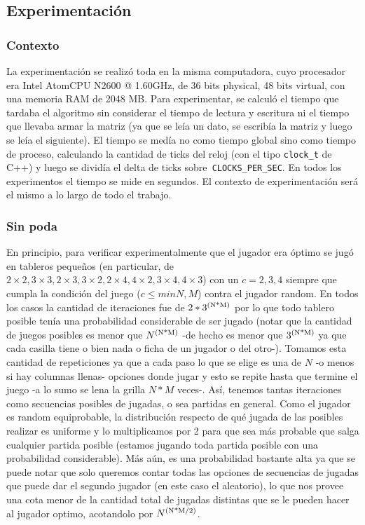 \documentclass[A4paper,oneside,fleqn,11pt]{article}
\theoremstyle{definition}
\begin{document}
\subsection{Experimentación}

\subsubsection{Contexto} 


La experimentación se realizó toda en la misma computadora, cuyo procesador era Intel Atom\texttrademark CPU N2600 @ 1.60GHz, de 36 bits physical, 48 bits virtual, con una memoria RAM de 2048 MB.  Para experimentar, se calculó el tiempo que tardaba el algoritmo sin considerar el tiempo de lectura y escritura ni el tiempo que llevaba armar la matriz (ya que se leía un dato, se escribía la matriz y luego se leía el siguiente). 
El tiempo se medía no como tiempo global sino como tiempo de proceso, calculando la cantidad de ticks del reloj (con el tipo \texttt{clock\_t} de C++) y luego se dividía el delta de ticks sobre\texttt{ CLOCKS\_PER\_SEC}. En todos los experimentos el tiempo se mide en segundos. El contexto de experimentación será el mismo a lo largo de todo el trabajo.

\subsubsection{Sin poda}
En principio, para verificar experimentalmente que el jugador era óptimo se jugó en tableros pequeños (en particular, de $2\times2, 3\times3, 2\times3, 3\times2, 2\times4, 4\times2, 3\times4, 4\times3$) con un $c=2, 3, 4$ siempre que cumpla la condición del juego ($c\leq min{N,M}$) contra el jugador random. En todos los casos la cantidad de iteraciones fue de $2*3\textsuperscript{(N*M)}$ por lo que todo tablero posible tenía una probabilidad considerable de ser jugado (notar que la cantidad de juegos posibles es menor que  $N\textsuperscript{(N*M)}$ -de hecho es menor que $3\textsuperscript{(N*M)}$ ya que cada casilla tiene o bien nada o ficha de un jugador o del otro-). Tomamos esta cantidad de repeticiones ya que a cada paso lo que se elige es una de $N$ -o menos si hay columnas llenas- opciones donde jugar y esto se repite hasta que termine el juego -a lo sumo se lena la grilla $N*M$ veces-. Así, tenemos tantas iteraciones como secuencias posibles de jugadas, o sea partidas en general. Como el jugador es random equiprobable, la distribución respecto de qué jugada de las posibles realizar es uniforme y lo multiplicamos por 2 para que sea más probable que salga cualquier partida posible (estamos jugando toda partida posible con una probabilidad considerable). Más aún, es una probabilidad bastante alta ya que se puede notar que solo queremos contar todas las opciones de secuencias de jugadas que puede dar el segundo jugador (en este caso el aleatorio), lo que nos provee una cota menor de la cantidad total de jugadas distintas que se le pueden hacer al jugador optimo, acotandolo por $N\textsuperscript{(N*M/2)}$. 
\end{document}
